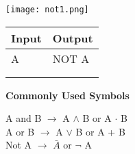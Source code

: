 \documentclass[11pt]{report}
\begin{document}
\vspace{20mm}
\hspace{1in}
\begin{minipage}{.5\linewidth}
	\texttt{[image: not1.png]}
	\label{img2}
\end{minipage}
\begin{minipage}{\linewidth}
	\begin{tabular}{|l|l|}
		\hline
		Input & Output \\ \hline
		A     & NOT A  \\ \hline
		&        \\ \hline
		&        \\ \hline
	\end{tabular}
\end{minipage}


\vspace{10mm}
\begin{center}
	\Large
	\textbf{Commonly Used Symbols}
	\normalsize
	
	A and B $\rightarrow$ A $\wedge$ B or A $\cdot$ B\\
	A or B $\rightarrow$ A $\vee $ B or A + B\\
	Not A $\rightarrow$ $\bar{A}$ or $\neg$ A\\
\end{center}
\end{document}
